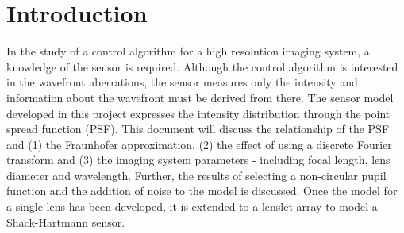 \section{Introduction}

In the study of a control algorithm for a high resolution imaging system, a knowledge of the sensor is required.  Although the control algorithm is interested in the wavefront aberrations, the sensor measures only the intensity and information about the wavefront must be derived from there.  The sensor model developed in this project expresses the intensity distribution through the point spread function (PSF). This document will discuss the relationship of the PSF and (1) the Fraunhofer approximation, (2) the effect of using a discrete Fourier transform and (3) the imaging system parameters - including focal length, lens diameter and wavelength.  Further, the results of selecting a non-circular pupil function and the addition of noise to the model is discussed. Once the model for a single lens has been developed, it is extended to a lenslet array to model a Shack-Hartmann sensor.